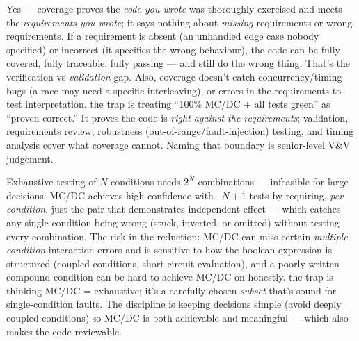 Yes --- coverage proves the \emph{code you wrote} was thoroughly exercised and
meets the \emph{requirements you wrote}; it says nothing about \emph{missing}
requirements or wrong requirements. If a requirement is absent (an unhandled edge
case nobody specified) or incorrect (it specifies the wrong behaviour), the code
can be fully covered, fully traceable, fully passing --- and still do the wrong
thing. That's the verification-vs-\emph{validation} gap. Also, coverage doesn't
catch concurrency/timing bugs (a race may need a specific interleaving), or
errors in the requirements-to-test interpretation. \trap the trap is treating
``100\% MC/DC + all tests green'' as ``proven correct.'' It proves the code is
\emph{right against the requirements}; validation, requirements review, robustness
(out-of-range/fault-injection) testing, and timing analysis cover what coverage
cannot. Naming that boundary is senior-level V\&V judgement.

Exhaustive testing of $N$ conditions needs $2^N$ combinations --- infeasible for
large decisions. MC/DC achieves high confidence with ~$N+1$ tests by requiring,
\emph{per condition}, just the pair that demonstrates independent effect ---
which catches any single condition being wrong (stuck, inverted, or omitted)
without testing every combination. The risk in the reduction: MC/DC can miss
certain \emph{multiple-condition} interaction errors and is sensitive to how the
boolean expression is structured (coupled conditions, short-circuit evaluation),
and a poorly written compound condition can be hard to achieve MC/DC on
honestly. \trap the trap is thinking MC/DC = exhaustive; it's a carefully chosen
\emph{subset} that's sound for single-condition faults. The discipline is
keeping decisions simple (avoid deeply coupled conditions) so MC/DC is both
achievable and meaningful --- which also makes the code reviewable.

